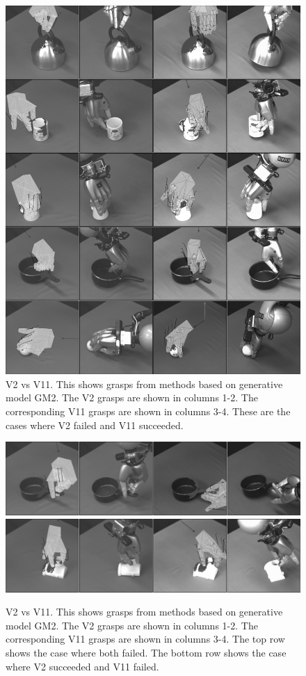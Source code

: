 \begin{figure}[t]
\begin{center}
\includegraphics[width=0.5\columnwidth]{plots/A6fA10s_vertical.jpg}
\caption{V2 vs V11. This shows grasps from methods based on generative model GM2. The V2 grasps are shown in columns 1-2. The corresponding V11 grasps are shown in columns 3-4. These are the cases where V2 failed and V11 succeeded. \label{fig:v2fv11s}}
\end{center}
\end{figure}

\begin{figure}[t]
\begin{center}
\includegraphics[width=0.5\columnwidth]{plots/A6fA10f_vertical.jpg}\\
\includegraphics[width=0.5\columnwidth]{plots/A6sA10f_vertical.jpg}
\caption{V2 vs V11. This shows grasps from methods based on generative model GM2. The V2 grasps are shown in columns 1-2. The corresponding V11 grasps are shown in columns 3-4. The top row shows the case where both failed. The bottom row shows the case where V2 succeeded and V11 failed. \label{fig:v2fsv11f}}
\end{center}
\end{figure}

